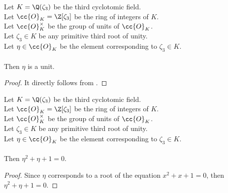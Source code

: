 \begin{lemma}
    \label{lmm:eta_isUnit}
    \leanok
    Let $K = \Q(\zeta_3)$ be the third cyclotomic field. \\
    Let $\cc{O}_K = \Z[\zeta_3]$ be the ring of integers of $K$. \\
    Let $\cc{O}^\times_K$ be the group of units of $\cc{O}_K$. \\
    Let $\zeta_3 \in K$ be any primitive third root of unity. \\
    Let $\eta \in \cc{O}_K$ be the element corresponding to $\zeta_3 \in K$. \\\\
    Then $\eta$ is a unit.
\end{lemma}
\begin{proof}
    \leanok
    It directly follows from .
\end{proof}

\begin{lemma}
    \label{lmm:toInteger_eval_cyclo}
    \leanok
    Let $K = \Q(\zeta_3)$ be the third cyclotomic field. \\
    Let $\cc{O}_K = \Z[\zeta_3]$ be the ring of integers of $K$. \\
    Let $\cc{O}^\times_K$ be the group of units of $\cc{O}_K$. \\
    Let $\zeta_3 \in K$ be any primitive third root of unity. \\
    Let $\eta \in \cc{O}_K$ be the element corresponding to $\zeta_3 \in K$. \\\\
    Then $\eta^2 + \eta + 1 = 0$.
\end{lemma}
\begin{proof}
    \leanok
    Since $\eta$ corresponds to a root of the equation $x^2 + x + 1 = 0$,
    then $\eta^2 + \eta + 1 = 0$.
\end{proof}

